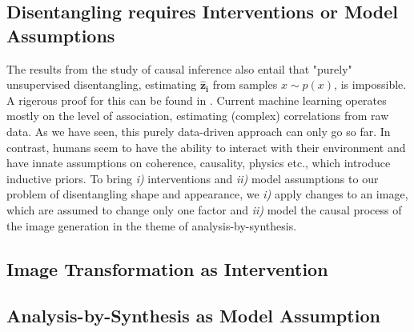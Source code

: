	\subsection{Disentangling requires Interventions or Model Assumptions}\label{sec:requirements}
		The results from the study of causal inference also entail that "purely" unsupervised disentangling, \ie estimating $\mathbf{\hat z_i}$ from samples $x \sim p(x)$, is impossible. A rigerous proof for this can be found in \cite{locatello18challenging}.
		Current machine learning operates mostly on the level of association, estimating (complex) correlations from raw data.
		As we have seen, this purely data-driven approach can only go so far.
		In contrast, humans seem to have the ability to interact with their environment and have innate assumptions on coherence, causality, physics etc., which introduce inductive priors.
		To bring \emph{i)} interventions and \emph{ii)} model assumptions to our problem of disentangling shape and appearance, we \emph{i)} apply changes to an image, which are assumed to change only one factor and \emph{ii)} model the causal process of the image generation in the theme of analysis-by-synthesis.
%
%
%

	\subsection{Image Transformation as Intervention}\label{sec:transform}

	\subsection{Analysis-by-Synthesis as Model Assumption}\label{sec:anabysyn}
